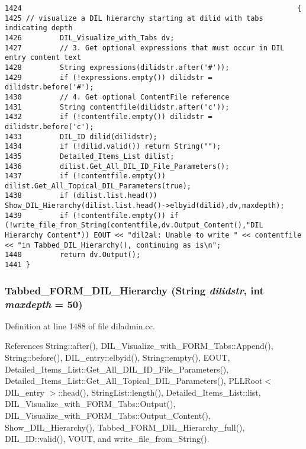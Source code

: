 \footnotesize\begin{verbatim}1424                                                                 {
1425 // visualize a DIL hierarchy starting at dilid with tabs indicating depth
1426         DIL_Visualize_with_Tabs dv;
1427         // 3. Get optional expressions that must occur in DIL entry content text
1428         String expressions(dilidstr.after('#'));
1429         if (!expressions.empty()) dilidstr = dilidstr.before('#');
1430         // 4. Get optional ContentFile reference
1431         String contentfile(dilidstr.after('c'));
1432         if (!contentfile.empty()) dilidstr = dilidstr.before('c');
1433         DIL_ID dilid(dilidstr);
1434         if (!dilid.valid()) return String("");
1435         Detailed_Items_List dilist;
1436         dilist.Get_All_DIL_ID_File_Parameters();
1437         if (!contentfile.empty()) dilist.Get_All_Topical_DIL_Parameters(true);
1438         if (dilist.list.head()) Show_DIL_Hierarchy(dilist.list.head()->elbyid(dilid),dv,maxdepth);
1439         if (!contentfile.empty()) if (!write_file_from_String(contentfile,dv.Output_Content(),"DIL Hierarchy Content")) EOUT << "dil2al: Unable to write " << contentfile << "in Tabbed_DIL_Hierarchy(), continuing as is\n";
1440         return dv.Output();
1441 }
\end{verbatim}\normalsize 
{}
\subsubsection{ Tabbed\_\-FORM\_\-DIL\_\-Hierarchy ({\bf String} {\em dilidstr}, int {\em maxdepth} = 50)}\label{diladmin_8cc_a24}




Definition at line 1488 of file diladmin.cc.

References String::after(), DIL\_\-Visualize\_\-with\_\-FORM\_\-Tabs::Append(), String::before(), DIL\_\-entry::elbyid(), String::empty(), EOUT, Detailed\_\-Items\_\-List::Get\_\-All\_\-DIL\_\-ID\_\-File\_\-Parameters(), Detailed\_\-Items\_\-List::Get\_\-All\_\-Topical\_\-DIL\_\-Parameters(), PLLRoot$<$ DIL\_\-entry $>$::head(), String\-List::length(), Detailed\_\-Items\_\-List::list, DIL\_\-Visualize\_\-with\_\-FORM\_\-Tabs::Output(), DIL\_\-Visualize\_\-with\_\-FORM\_\-Tabs::Output\_\-Content(), Show\_\-DIL\_\-Hierarchy(), Tabbed\_\-FORM\_\-DIL\_\-Hierarchy\_\-full(), DIL\_\-ID::valid(), VOUT, and write\_\-file\_\-from\_\-String().

